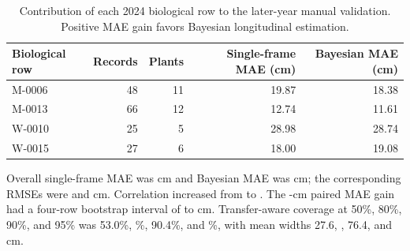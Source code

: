 \documentclass[review,12pt,authoryear]{elsarticle}
\begin{document}
\begin{table}[htbp]
\caption{Contribution of each 2024 biological row to the later-year manual validation. Positive MAE gain favors Bayesian longitudinal estimation.}
\label{tab:s-2024-row}
\centering\small
\begin{tabular}{lrrrr}
\toprule
Biological row & Records & Plants & Single-frame MAE (cm) & Bayesian MAE (cm) \\
\midrule
M-0006 & 48 & 11 & 19.87 & 18.38 \\
M-0013 & 66 & 12 & 12.74 & 11.61 \\
W-0010 & 25 & 5 & 28.98 & 28.74 \\
W-0015 & 27 & 6 & 18.00 & 19.08 \\
\bottomrule
\end{tabular}
\end{table}

Overall single-frame MAE was \TransferSingleMAE{} cm and Bayesian MAE was \TransferBayesMAE{} cm; the corresponding RMSEs were \TransferSingleRMSE{} and \TransferBayesRMSE{} cm. Correlation increased from \TransferSingleCorrelation{} to \TransferBayesCorrelation{}. The \TransferMAEGain{}-cm paired MAE gain had a four-row bootstrap interval of \TransferMAEGainLo{} to \TransferMAEGainHi{} cm. Transfer-aware coverage at 50\%, 80\%, 90\%, and 95\% was 53.0\%, \TransferCoverageEighty{}\%, 90.4\%, and \TransferCoverageNinetyFive{}\%, with mean widths 27.6, \TransferWidthEighty{}, 76.4, and \TransferWidthNinetyFive{} cm.

\begin{table}[htbp]
\caption{Fixed causal comparator results against 2024 manual field height. Baseline-minus-Bayesian MAE is positive when the Bayesian estimate has lower MAE.}
\label{tab:s-2024-baselines}
\centering\small
{}
\end{table}
\end{document}
